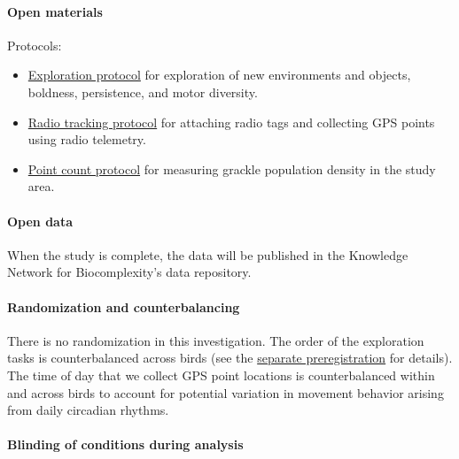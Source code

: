 \documentclass[
]{article}
\providecommand{\tightlist}{%
  \setlength{\itemsep}{0pt}\setlength{\parskip}{0pt}}
\begin{document}
\hypertarget{open-materials}{%
\paragraph{Open materials}\label{open-materials}}

Protocols:

\begin{itemize}
\tightlist
\item
  \href{https://docs.google.com/document/d/1sEMc5z2fw6S9C-wVfc2zV331CRPpu3NuA7IhSFUZJpE/edit?usp=sharing}{Exploration
  protocol} for exploration of new environments and objects, boldness,
  persistence, and motor diversity.
\item
  \href{https://docs.google.com/document/d/1jtjgeWJoZ0Q1CfUpV6zdkyQL3p3WfW9KgyLrMNmNMJc/edit?usp=sharing}{Radio
  tracking protocol} for attaching radio tags and collecting GPS points
  using radio telemetry.
\item
  \href{https://docs.google.com/document/d/1zDuoI0v7Rv0iwrTMAZSERH7AB4v85qXzxsx5T0daNNo/edit?usp=sharing}{Point
  count protocol} for measuring grackle population density in the study
  area.
\end{itemize}

\hypertarget{open-data}{%
\paragraph{Open data}\label{open-data}}

When the study is complete, the data will be published in the Knowledge
Network for Biocomplexity's data repository.

\hypertarget{randomization-and-counterbalancing}{%
\paragraph{Randomization and
counterbalancing}\label{randomization-and-counterbalancing}}

There is no randomization in this investigation. The order of the
exploration tasks is counterbalanced across birds (see the
\href{http://corinalogan.com/Preregistrations/g_exploration.html}{separate
preregistration} for details). The time of day that we collect GPS point
locations is counterbalanced within and across birds to account for
potential variation in movement behavior arising from daily circadian
rhythms.

\hypertarget{blinding-of-conditions-during-analysis}{%
\paragraph{Blinding of conditions during
analysis}\label{blinding-of-conditions-during-analysis}}
\end{document}
